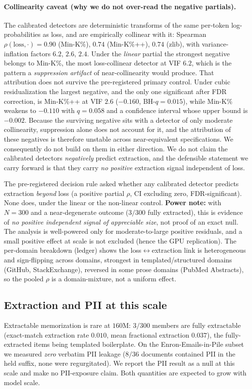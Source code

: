 \paragraph{Collinearity caveat (why we do not over-read the negative partials).} The calibrated
detectors are deterministic transforms of the same per-token log-probabilities as loss, and are
empirically collinear with it: Spearman $\rho(\text{loss},\cdot)=0.90$ (Min-K\%), $0.74$ (Min-K\%++),
$0.74$ (zlib), with variance-inflation factors $6.2$, $2.6$, $2.4$. Under the \emph{linear} partial
the strongest negative belongs to Min-K\%, the most loss-collinear detector at VIF $6.2$, which is
the pattern a \emph{suppression artifact} of near-collinearity would produce. That attribution does
not survive the pre-registered primary control. Under cubic residualization the largest negative, and
the only one significant after FDR correction, is Min-K\%++ at VIF $2.6$ ($-0.160$, BH-$q=0.015$),
while Min-K\% weakens to $-0.110$ with $q=0.058$ and a confidence interval whose upper bound is
$-0.002$. Because the surviving negative sits with a detector of only moderate collinearity,
suppression alone does not account for it, and the attribution of these negatives is therefore
unstable across near-equivalent specifications. We consequently do not build on them in either
direction. We do not claim the calibrated detectors \emph{negatively} predict extraction, and the
defensible statement we carry forward is that they carry \emph{no positive} extraction signal
independent of loss.

\noindent The pre-registered decision rule asked whether any calibrated detector predicts extraction
\emph{beyond} loss (a positive partial $\rho$, CI excluding zero, FDR-significant). None does, under
the linear or the non-linear control. \textbf{Power note:} with $N=300$ and a near-degenerate
outcome ($3/300$ fully extracted), this is evidence of \emph{no positive independent signal of
appreciable size}, not proof of an exact null. The analysis is well-powered only for moderate-to-large
positive residuals, and a small positive effect at scale is not excluded (hence the GPU replication).
The per-domain breakdown (ledger) shows the loss$\leftrightarrow$extraction link is heterogeneous and
sign-flipping across domains, strongest in templated/structured domains (GitHub, StackExchange),
reversed in some prose domains (PubMed Abstracts), so the pooled $\rho$ is a domain-mixture, not a
uniform effect.

\subsection{Extraction and PII at this scale}
\label{sec:res-extraction}
Extractable memorization is rare at $160$M: $3/300$ members are fully extractable (exact-match
extraction rate $0.010$, mean fractional extraction $0.037$), the fully-extracted items being
templated boilerplate. On the Enron-Emails-in-Pile subset we measured \emph{zero} verbatim PII
leakage ($8/36$ documents contained PII in the held suffix, none were regurgitated). We report the
PII result as a null at this scale and make no PII-exposure claim. Both quantities are expected to
grow with model scale.

